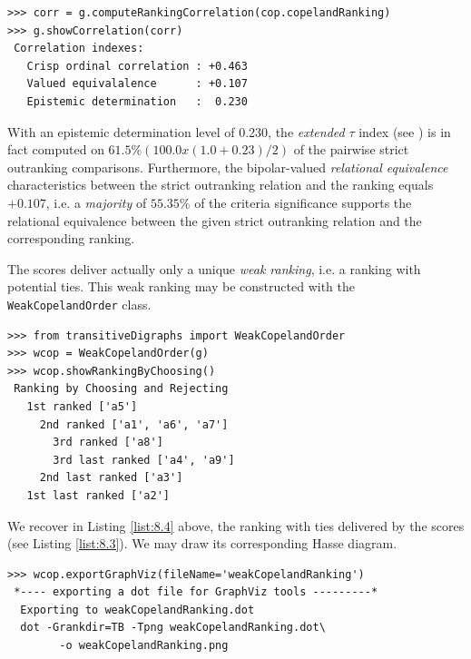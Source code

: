 \begin{lstlisting}[caption={Checking the quality of the \Copeland Ranking},label=list:8.4]
>>> corr = g.computeRankingCorrelation(cop.copelandRanking)
>>> g.showCorrelation(corr)
 Correlation indexes:
   Crisp ordinal correlation : +0.463
   Valued equivalalence      : +0.107
   Epistemic determination   :  0.230
\end{lstlisting}

With an epistemic determination level of 0.230, the \emph{extended} \Kendall $\tau$ index (see \citep{BIS-2012a}) is in fact computed on $61.5\% (100.0 x (1.0 + 0.23)/2)$ of the pairwise strict outranking comparisons. Furthermore, the bipolar-valued \emph{relational equivalence} characteristics between the strict outranking relation and the \Copeland ranking equals $+0.107$, i.e. a \emph{majority} of $55.35\%$ of the criteria significance supports the relational equivalence between the given strict outranking relation and the corresponding \Copeland ranking.

The \Copeland scores deliver actually only a unique \emph{weak ranking}, i.e. a ranking with potential ties. This weak ranking may be constructed with the \texttt{WeakCopelandOrder} class.

\begin{lstlisting}[caption={Checking the quality of the \Copeland Ranking},label=list:8.4]
>>> from transitiveDigraphs import WeakCopelandOrder
>>> wcop = WeakCopelandOrder(g)
>>> wcop.showRankingByChoosing()
 Ranking by Choosing and Rejecting
   1st ranked ['a5']
     2nd ranked ['a1', 'a6', 'a7']
       3rd ranked ['a8']
       3rd last ranked ['a4', 'a9']
     2nd last ranked ['a3']
   1st last ranked ['a2']
\end{lstlisting}

We recover in Listing \ref{list:8.4} above, the ranking with ties delivered by the \Copeland scores (see Listing \ref{list:8.3}). We may draw its corresponding Hasse diagram.

\begin{lstlisting}
>>> wcop.exportGraphViz(fileName='weakCopelandRanking')
 *---- exporting a dot file for GraphViz tools ---------*
  Exporting to weakCopelandRanking.dot
  dot -Grankdir=TB -Tpng weakCopelandRanking.dot\
        -o weakCopelandRanking.png
\end{lstlisting}

